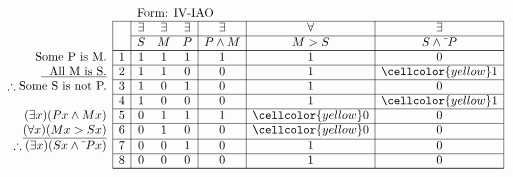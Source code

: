 \documentclass[10pt,legalpaper,landscape,cmtt]{article}
\begin{document}
{\begin{minipage}[t]{3.25in}
	\)
\end{minipage}\begin{minipage}[t]{3.25in}
	\(
	\begin{array}{r|c|ccc|c|c|c|}
		\multicolumn{2}{c}{}&\multicolumn{6}{l}{\mbox{Form: IV-IAO}} \\ \cline{2-8}
		\hspace{1in}	&	& \exists & \exists & \exists & \exists & \forall & \exists\\ \cline{3-8}
		&	& S & M & P &  P \wedge M  &  M > S  &  S \wedge \tilde~P \\ \cline{2-8} \cline{2-8}
		\phantom{\therefore}\mbox{Some P is M.}   & 1 & 1 & 1 & 1 &   1   &   1   &   0  \\ \cline{2-8}
		\underline{\phantom{\therefore}\mbox{All M is S.}}   & 2 & 1 & 1 & 0 &   0   &   1   &   \cellcolor{yellow} 1  \\ \cline{2-8}
		\therefore \mbox{Some S is not P.}   & 3 & 1 & 0 & 1 &   0   &   1   &   0  \\ \cline{2-8}
		& 4 & 1 & 0 & 0 &   0   &   1   &   \cellcolor{yellow} 1  \\ \cline{2-8}
		(\exists x)(Px \wedge Mx)   & 5 & 0 & 1 & 1 &   1   &   \cellcolor{yellow} 0   &   0  \\ \cline{2-8}
		\underline{(\forall x)(Mx > Sx)}   & 6 & 0 & 1 & 0 &   0   &   \cellcolor{yellow} 0   &   0  \\ \cline{2-8}
		\therefore(\exists x)(Sx \wedge \tilde~Px)   & 7 & 0 & 0 & 1 &   0   &   1   &   0  \\ \cline{2-8}
		& 8 & 0 & 0 & 0 &   0   &   1   &   0   \\ \cline{2-8}\cline{2-8} 
	\end{array}
	\)
\end{minipage}

\newpage %

}
\end{document}
